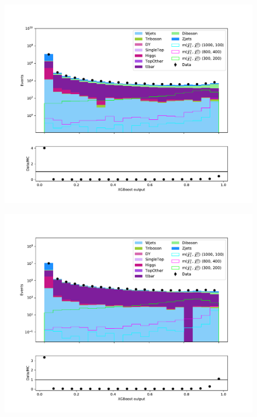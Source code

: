 \begin{figure}[H]
    \centering
        \includegraphics[width = \textwidth]{Figures/Stacked/stackedplot_BDT_Low_level_slepsnu.pdf}
        \caption{}
        \label{fig:traintestscaled}
\end{figure}

\begin{figure}[H]
    \centering
        \includegraphics[width = \textwidth]{Figures/Stacked/stackedplot_BDT_High_level_slepsnu.pdf}
        \caption{}
        \label{fig:traintestscaled}
\end{figure}








